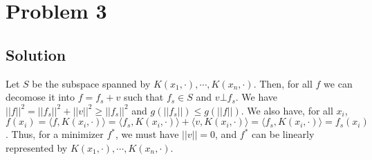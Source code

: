 \documentclass[11pt]{report}
\begin{document}
\section*{Problem 3}
\subsection*{Solution}
Let $S$ be the subspace spanned by $K(x_1,\cdot), \cdots, K(x_n, \cdot)$. Then, for all $f$ we can decomose it into $f = f_s + v$ such that $f_s \in S$ and $v \bot f_s$. We have $||f||^2 = ||f_s||^2 + ||v||^2 \geq ||f_s||^2$ and $g(||f_s||) \leq g(||f||)$. We also have, for all $x_i$, $f(x_i) = \langle f,K(x_i,\cdot) \rangle = \langle f_s,K(x_i,\cdot) \rangle + \langle v,K(x_i,\cdot) \rangle = \langle f_s,K(x_i,\cdot) \rangle = f_s(x_i)$. Thus, for a minimizer $f^*$, we must have $||v|| = 0$, and $f^*$ can be linearly represented by $K(x_1,\cdot), \cdots, K(x_n, \cdot)$.
\end{document}
